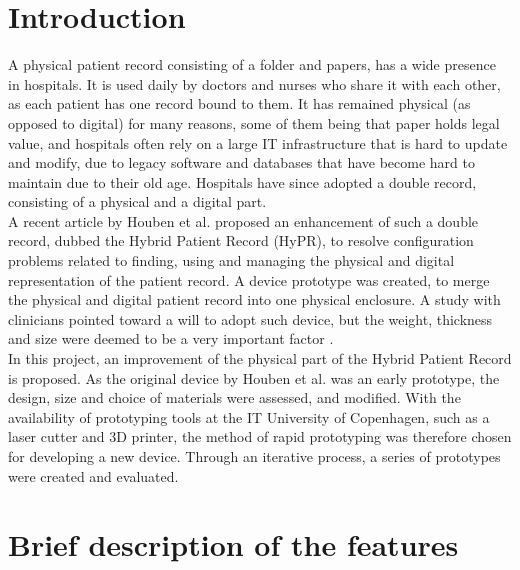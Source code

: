 \section{Introduction}

A physical patient record consisting of a folder and papers, has a wide presence in hospitals. It is used daily by doctors and nurses who share it with each other, as each patient has one record bound to them. It has remained physical (as opposed to digital) for many reasons, some of them being that paper holds legal value, and hospitals often rely on a large IT infrastructure that is hard to update and modify, due to legacy software and databases that have become hard to maintain due to their old age. Hospitals have since adopted a double record, consisting of a physical and a digital part. \\

A recent article by Houben et al. proposed an enhancement of such a double record, dubbed the Hybrid Patient Record (HyPR), to resolve configuration problems related to finding, using and managing the physical and digital representation of the patient record. A device prototype was created, to merge the physical and digital patient record
into one physical enclosure. A study with clinicians pointed toward a will to adopt such device, but the weight, thickness and size were deemed to be a very important factor \cite{hypr}. \\

In this project, an improvement of the physical part of the Hybrid Patient Record is proposed. As the original device by Houben et al. was an early prototype, the design, size and choice of materials were assessed, and modified. With the availability of prototyping tools at the IT University of Copenhagen, such as a laser cutter and 3D printer, the method of rapid prototyping was therefore chosen for developing a new device. Through an iterative process, a series of prototypes were created and evaluated. 

\clearpage

\section{Brief description of the features}

